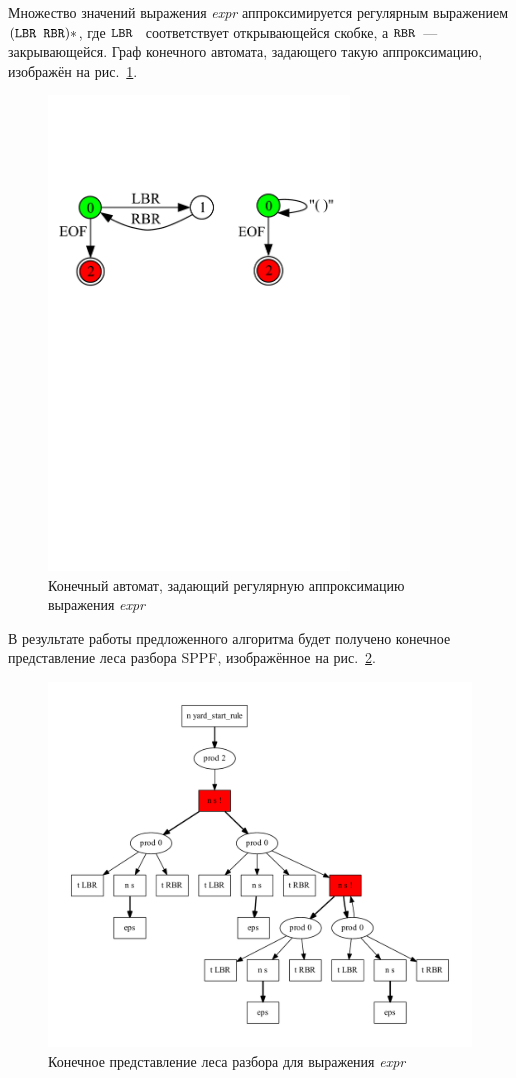 Множество значений выражения \emph{expr} аппроксимируется регулярным выражением $(\mbox{\texttt{LBR }} \mbox{\texttt{RBR}})*$, где $\mbox{\texttt{LBR }}$ соответствует открывающейся скобке, а $\mbox{\texttt{RBR}}$~--- закрывающейся. Граф конечного автомата, задающего такую аппроксимацию, изображён на рис.~\ref{input}.
\begin{figure}[H]
 \centering
 \includegraphics[width=8cm]{Verbitskaya/pics/input.pdf}
 \caption{Конечный автомат, задающий регулярную аппроксимацию выражения \emph{expr}}
 \label{input}
\end{figure}

В результате работы предложенного алгоритма будет получено конечное представление леса разбора SPPF, изображённое на рис.~\ref{sppf}.
\begin{figure}[H]
 \centering
 \includegraphics[width=\textwidth]{Verbitskaya/pics/sppf.pdf}
 \caption{Конечное представление леса разбора для выражения \emph{expr}}
 \label{sppf}
\end{figure}

